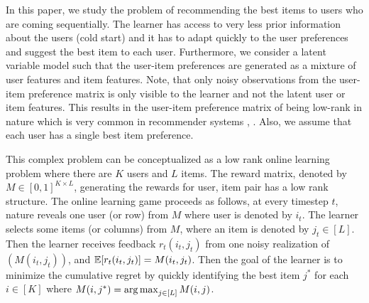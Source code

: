 In this paper, we study the problem of recommending the best items to users who are coming sequentially. The learner has access to very less prior information about the users (cold start) and it has to adapt quickly to the user preferences and suggest the best item to each user. Furthermore, we consider a latent variable model such that the user-item preferences are generated as a mixture of user features and item features. Note, that only noisy observations from the user-item preference matrix is only visible to the learner and not the latent user or item features. This results in the user-item preference matrix of being low-rank in nature which is very common in recommender systems \citep{koren2009matrix}, \citep{ricci2011liorrokach}. Also, we assume that each user has a single best item preference.



	This complex problem can be conceptualized as a low rank online learning  problem where there are $K$ users and $L$ items. The reward matrix, denoted by $M\in [0,1]^{K\times L}$,  generating the rewards for user, item pair has a low rank structure. The online learning game proceeds as follows, at every timestep $t$,  nature reveals one user (or row) from $M$ where user is denoted by $i_t$. The learner selects some items (or columns) from $M$, where an item is denoted by $j_t\in [L]$. Then the learner receives feedback $r_{t}(i_t,j_t)$ from one noisy realization of $(M(i_t,j_t))$, and $\mathbb{E}[r_{t}(i_t,j_t)] = M(i_t,j_t)$. Then the goal of the learner is to minimize the cumulative regret by quickly identifying the best item $j^*$ for each $i\in [K]$ where $M(i,j^*) = \mathop{\rm arg\,max} _{j\in[L]} M(i,j)$. 
	
